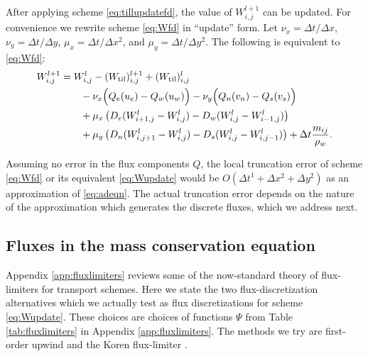 \documentclass[11pt,final]{amsart}
\newcommand{\Wtil}{W_{\text{til}}}
\newcommand{\Wlij}{W^l_{i,j}}
\begin{document}
After applying scheme \eqref{eq:tillupdatefd}, the value of $W_{i,j}^{l+1}$ can be updated.  For convenience we rewrite scheme \eqref{eq:Wfd} in ``update'' form.  Let $\nu_x = \Delta t/\Delta x$, $\nu_y = \Delta t/\Delta y$, $\mu_x = \Delta t/\Delta x^2$, and $\mu_y = \Delta t/\Delta y^2$.  The following is equivalent to \eqref{eq:Wfd}:
\begin{align}
 W_{i,j}^{l+1} &= W_{i,j}^l - (\Wtil)_{i,j}^{l+1} + (\Wtil)_{i,j}^l \label{eq:Wupdate} \\
  &\qquad - \nu_x \Big(Q_e(u_e) - Q_w(u_w)\Big) - \nu_y \Big(Q_n(v_n) - Q_s(v_s)\Big) \notag \\
  &\qquad + \mu_x \left(D_e (W_{i+1,j}^l - \Wlij) - D_w (\Wlij - W_{i-1,j}^l)\right) \notag \\
  &\qquad + \mu_y \left(D_n (W_{i,j+1}^l - \Wlij) - D_s (\Wlij - W_{i,j-1}^l)\right) + \Delta t \frac{m_{ij}}{\rho_w}. \notag
\end{align}

Assuming no error in the flux components $Q$, the local truncation error \citep{MortonMayers} of scheme \eqref{eq:Wfd} or its equivalent \eqref{eq:Wupdate} would be $O(\Delta t^1 + \Delta x^2 + \Delta y^2)$ as an approximation of \eqref{eq:adeqn}.  The actual truncation error depends on the nature of the approximation which generates the discrete fluxes, which we address next.


\subsection*{Fluxes in the mass conservation equation}  Appendix \ref{app:fluxlimiters} reviews some of the now-standard theory of flux-limiters for transport schemes.  Here we state the two flux-discretization alternatives which we actually test as flux discretizations for scheme \eqref{eq:Wupdate}.  These choices are choices of functions $\Psi$ from Table \ref{tab:fluxlimiters} in Appendix \ref{app:fluxlimiters}.  The methods we try are first-order upwind and the Koren flux-limiter \citep{HundsdorferVerwer2010}.
\end{document}
